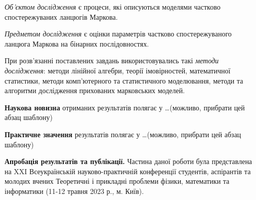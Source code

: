 \emph{Об'єктом дослідження} є процеси, які описуються моделями частково спостережуваних ланцюгів Маркова.

\emph{Предметом дослідження} є оцінки параметрів частково спостережуваного ланцюга Маркова на бінарних послідовностях.

При розв’язанні поставлених завдань використовувались такі \emph{методи дослідження}: методи лінійної  алгебри, теорії імовірностей, математичної статистики, методи комп’ютерного та статистичного моделювання, методи та алгоритми дослідження прихованих марковських моделей.

\textbf{Наукова новизна} отриманих результатів полягає у \dots (можливо, прибрати цей абзац шаблону)

\textbf{Практичне значення} результатів полягає у \dots (можливо, прибрати цей абзац шаблону)

\textbf{Апробація результатів та публікації.} Частина даної роботи була представлена на XXI Всеукраїнській науково-практичній конференції студентів, аспірантів та молодих вчених Теоретичні і прикладні проблеми фізики, математики та інформатики (11-12 травня 2023 р., м. Київ).